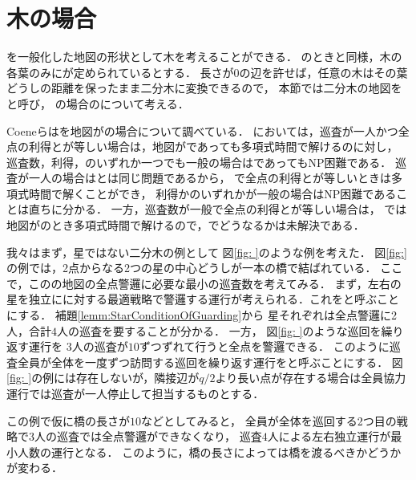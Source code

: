 \section*{木の場合}

{\graphStar}を一般化した地図の形状として木を考えることができる．
{\graphStar}のときと同様，木の各葉のみに{\maxIdletime}が定められているとする．
長さが$0$の辺を許せば，任意の木はその葉どうしの距離を保ったまま二分木に変換できるので，
本節では二分木の地図を{\graphTree}と呼び，
{\graphTree}の場合の{\patProb}について考える．

Coeneら\cite{coene2011charlemagne}は{\independentPatProb}を地図が{\graphTree}の場合について調べている．
{\independentPatProb}においては，巡査が一人かつ全点の利得と{\maxIdletime}が等しい場合は，地図が{\graphTree}であっても多項式時間で解ける\cite[Corollary~3]{coene2011charlemagne}のに対し，
巡査数，利得，{\maxIdletime}のいずれか一つでも一般の場合は{\graphStar}であってもNP困難である\cite[Theorems 5, 6 and 10]{coene2011charlemagne}．
巡査が一人の場合は{\patProb}と{\independentPatProb}は同じ問題であるから，
{\graphTree}で全点の利得と{\maxIdletime}が等しいときは多項式時間で解くことができ，
利得か{\maxIdletime}のいずれかが一般の場合はNP困難であることは直ちに分かる．
一方，巡査数が一般で全点の利得と{\maxIdletime}が等しい場合は，
{\patProb}では
地図が{\graphStar}のとき多項式時間で解けるので，{\graphTree}でどうなるかは未解決である．

\newcommand{\separatedPatroll}{左右独立運行}
\newcommand{\cooperativePatroll}{全員協力運行}

我々はまず，星ではない二分木の例として
図\ref{fig: }のような例を考えた．
図\ref{fig:}の例では，2点からなる2つの星の中心どうしが一本の橋で結ばれている．
ここで，この{\graphTree}の地図の全点警邏に必要な最小の巡査数を考えてみる．
%
まず，左右の星を独立に{\graphStar}に対する最適戦略で警邏する運行が考えられる．これを\defword{\separatedPatroll}と呼ぶことにする．
補題\ref{lemm:StarConditionOfGuarding}から
星それぞれは全点警邏に2人，合計$4$人の巡査を要することが分かる．
%
一方，
図\ref{fig: }のような巡回を繰り返す運行を
$3$人の巡査が{\maxIdletime}$10$ずつずれて行うと全点を警邏できる．
このように巡査全員が全体を一度ずつ訪問する巡回を繰り返す運行を\defword{\cooperativePatroll}と呼ぶことにする．
図\ref{fig: }の例には存在しないが，隣接辺が$q/2$より長い点が存在する場合は{\cooperativePatroll}では巡査が一人停止して担当するものとする．

この例で仮に橋の長さが$10$などとしてみると，
全員が全体を巡回する2つ目の戦略で$3$人の巡査では全点警邏ができなくなり，
巡査$4$人による{\separatedPatroll}が最小人数の運行となる．
このように，橋の長さによっては橋を渡るべきかどうかが変わる．

